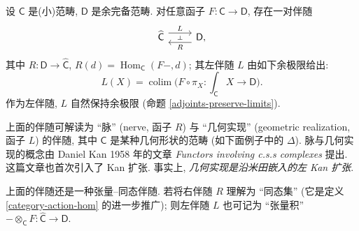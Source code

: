 \begin{prop}
	[label={nerve-and-realization}]
	{}
	设 $\mathsf C$ 是(小)范畴, $\mathsf D$ 是余完备范畴.
	对任意函子 $F \colon \mathsf C \to \mathsf D$, 存在一对伴随
	\[\begin{tikzcd}[ampersand replacement=\&]
		{\widehat {\mathsf C}} \& {\mathsf D,}
		\arrow[""{name=0, anchor=center, inner sep=0}, "L", shift left=2, from=1-1, to=1-2]
		\arrow[""{name=1, anchor=center, inner sep=0}, "R", shift left=2, from=1-2, to=1-1]
		\arrow["\dashv"{anchor=center, rotate=-90}, draw=none, from=0, to=1]
	\end{tikzcd}\]
	其中 $R \colon \mathsf D \to \widehat {\mathsf C}$,
	$R(d) = \operatorname{Hom}_{\mathsf C}(F-,d)$;
	其左伴随 $L$ 由如下余极限给出:
	$$
	L (X) = \operatorname{colim}\Big(
	F\circ \pi_X \colon 
	{\displaystyle\int_{\mathsf C}X} \to {\mathsf D}
	\Big).
	$$
	作为左伴随, $L$ 自然保持余极限 (命题 \ref{adjoints-preserve-limits}).
\end{prop}

\begin{remark}
	{}
	上面的伴随可解读为 ``脉'' (nerve, 函子 $R$) 与 ``几何实现'' (geometric realization, 函子 $L$) 的伴随, 其中 $\mathsf C$ 是某种几何形状的范畴 (如下面例子中的 $\Delta$).
	脉与几何实现的概念由 Daniel Kan 1958 年的文章 \emph{Functors involving c.s.s complexes} 提出. 这篇文章也首次引入了 Kan 扩张. 事实上, \emph{几何实现是沿米田嵌入的左 Kan 扩张}.
\end{remark}

\begin{remark}
	[label={generalized-tensor-hom}]
	{}
	上面的伴随还是一种张量--同态伴随. 若将右伴随 $R$ 理解为 ``同态集'' (它是定义 \ref{category-action-hom} 的进一步推广); 则左伴随 $L$ 也可记为 ``张量积'' ${-}\otimes_{\mathsf C}F\colon \widehat {\mathsf C}\to\mathsf D$.
\end{remark}

